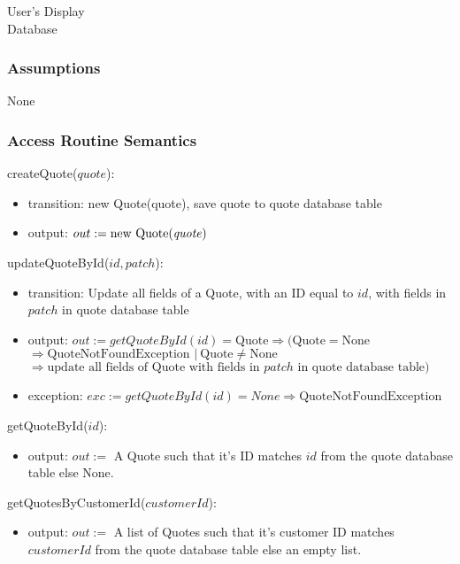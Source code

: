 \documentclass[12pt, titlepage]{article}
\begin{document}
User's Display \\ Database

\subsubsection{Assumptions}

None

\subsubsection{Access Routine Semantics}

\noindent createQuote($quote$):
\begin{itemize}
	\item transition: new Quote(quote), save quote to quote database table
	\item output: $out := \text{new Quote(\emph{quote})}$
\end{itemize}

\noindent updateQuoteById($id, patch$):
\begin{itemize}
	\item transition: Update all fields of a Quote, with an ID equal to $id$, with fields in $patch$ in quote
	      database table
	\item output: $out := getQuoteById(id) = \text{Quote} \Rightarrow (\text{Quote} = \text{None} $ \\
		      $\Rightarrow \text{QuoteNotFoundException } |\ \text{Quote} \neq \text{None}$ \\ $\Rightarrow
		      \text{update all fields of Quote with fields in } patch \text{ in quote database table})$
	\item exception: $exc := getQuoteById(id) = None \Rightarrow \text{QuoteNotFoundException}$
\end{itemize}

\noindent getQuoteById($id$):
\begin{itemize}
	\item output: $out :=$ A Quote such that it's ID matches $id$ from the quote database table else None.
\end{itemize}

\noindent getQuotesByCustomerId($customerId$):
\begin{itemize}
	\item output: $out :=$ A list of Quotes such that it's customer ID matches $customerId$ from the quote
	      database table else an empty list.
\end{itemize}
\end{document}
